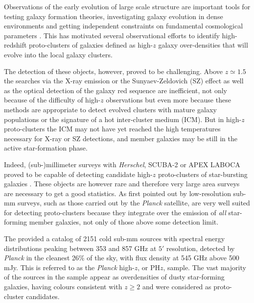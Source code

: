 \documentclass[useAMS,usenatbib]{mn2e}
\begin{document}
Observations of the early evolution of large scale structure are
important tools for testing galaxy formation theories,
investigating galaxy evolution in dense environments and getting
independent constraints on fundamental cosmological
parameters \citep[e.g.,][]{HarrisonColes2012,Casey2016}. This has
motivated several observational efforts to identify
high-redshift proto-clusters of galaxies \citep[for a review see][]{Overzier2016}
defined as high-$z$ galaxy over-densities that will evolve into the local galaxy clusters.

The detection of these objects, however, proved to be
challenging. Above $z\simeq 1.5$
the searches via the X-ray emission or the Sunyaev-Zeldovich (SZ)
effect as well as the optical  detection of the galaxy red sequence are inefficient, not only because of the
difficulty of high-$z$  observations but even more because these methods are appropriate to
detect evolved clusters with mature galaxy  populations or the signature of a hot inter-cluster medium (ICM). But
in high-$z$ proto-clusters the ICM may not have yet reached the high
temperatures  necessary for X-ray or SZ detections,
and member galaxies may be still in the active star-formation phase.

Indeed, (sub-)millimeter surveys with \textit{Herschel}, SCUBA-2 or
APEX LABOCA proved to be capable of detecting
candidate high-$z$ proto-clusters of star-bursting galaxies
\citep{Valtchanov2013,Dannerbauer2014,Rigby2014,Ma2015,Casey2015,Clements2016}.
These objects are however rare and therefore very large area surveys
are necessary to get a good statistics. As first pointed out by
\citet{Negrello2005} low-resolution sub-mm surveys, such as those
carried out by the \textit{Planck} satellite,
are very well suited for detecting proto-clusters because they integrate over the emission of \textit{all} star-forming member galaxies, not only of those above some detection limit.

The \citet[][PCXXXIX
hereafter]{PlanckCollaborationXXXIX2015} provided a catalog of 2151 cold sub-mm sources with spectral energy
distributions peaking between 353 and 857 GHz at $5'$ resolution,
detected by \textit{Planck} in the cleanest 26\% of the sky, with flux
density at 545 GHz above 500\,mJy. This is referred to as the
{\it Planck} high-$z$, or PH$z$, sample.
The vast majority of the
sources in the sample appear as overdensities of dusty star-forming galaxies,
having colours consistent with $z\ge 2$ and were considered as
proto-cluster candidates.
\end{document}
